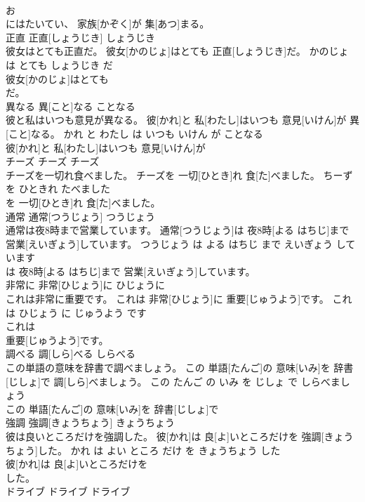 \documentclass[8pt]{extreport}
\begin{document}
\begin{CJK}{UTF8}{min}
\\	お
\\	にはたいてい、 家族[かぞく]が 集[あつ]まる。			
\\	正直	正直[しょうじき]	しょうじき	
\\	彼女はとても正直だ。	彼女[かのじょ]はとても 正直[しょうじき]だ。	かのじょ は とても しょうじき だ	
\\	彼女[かのじょ]はとても
\\	だ。			
\\	異なる	異[こと]なる	ことなる	
\\	彼と私はいつも意見が異なる。	彼[かれ]と 私[わたし]はいつも 意見[いけん]が 異[こと]なる。	かれ と わたし は いつも いけん が ことなる	
\\	彼[かれ]と 私[わたし]はいつも 意見[いけん]が
\\	チーズ	チーズ	チーズ	
\\	チーズを一切れ食べました。	チーズを 一切[ひとき]れ 食[た]べました。	ちーず を ひときれ たべました	
\\	を 一切[ひとき]れ 食[た]べました。			
\\	通常	通常[つうじょう]	つうじょう	
\\	通常は夜8時まで営業しています。	通常[つうじょう]は 夜8時[よる はちじ]まで 営業[えいぎょう]しています。	つうじょう は よる はちじ まで えいぎょう して います	
\\	は 夜8時[よる はちじ]まで 営業[えいぎょう]しています。			
\\	非常に	非常[ひじょう]に	ひじょうに	
\\	これは非常に重要です。	これは 非常[ひじょう]に 重要[じゅうよう]です。	これ は ひじょう に じゅうよう です	
\\	これは
\\	重要[じゅうよう]です。			
\\	調べる	調[しら]べる	しらべる	
\\	この単語の意味を辞書で調べましょう。	この 単語[たんご]の 意味[いみ]を 辞書[じしょ]で 調[しら]べましょう。	この たんご の いみ を じしょ で しらべましょう	
\\	この 単語[たんご]の 意味[いみ]を 辞書[じしょ]で
\\	強調	強調[きょうちょう]	きょうちょう	
\\	彼は良いところだけを強調した。	彼[かれ]は 良[よ]いところだけを 強調[きょうちょう]した。	かれ は よい ところ だけ を きょうちょう した	
\\	彼[かれ]は 良[よ]いところだけを
\\	した。			
\\	ドライブ	ドライブ	ドライブ	

\end{CJK}
\end{document}

